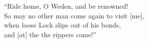 \bvb{}
“Ride home, O Weden, and be renowned! \\
So may no other man come again to visit [me], \\
when loose Lock slips out of his bonds,\\
and [at] the  the rippers come!”\evb\evg



\sectionline
